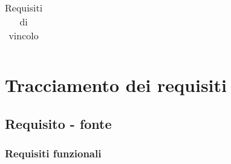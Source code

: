 {{{{\begin{center}
\begin{longtable}{|p{2.5cm}|p{4.5cm}|p{3.5cm}|p{4cm}|}
		\caption[Requisiti di vincolo]{Requisiti di vincolo}\label{4.4}\\
	\end{longtable}
\end{center}
\newpage
\section{Tracciamento dei requisiti}\label{RequisitiTracciamentoDeiRequisiti}

\subsection{Requisito - fonte}\label{RequisitiTracciamentoDeiRequisitiFonte}

\subsubsection{Requisiti funzionali}\label{RequisitiTracciamentoDeiRequisitiFonteRequisitiFunzionali}

}}}}
